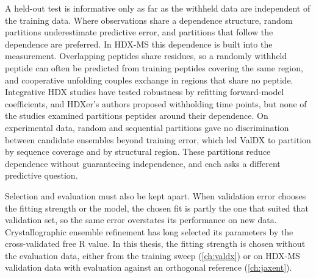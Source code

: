 A held-out test is informative only as far as the withheld data are independent of the training data. Where observations share a dependence structure, random partitions underestimate predictive error, and partitions that follow the dependence are preferred.\supercite{robertsCrossvalidationStrategiesData2017} In HDX-MS this dependence is built into the measurement. Overlapping peptides share residues, so a randomly withheld peptide can often be predicted from training peptides covering the same region, and cooperative unfolding couples exchange in regions that share no peptide.\supercite{englanderHydrogenExchangeModern1997,moulickPartiallyUnfoldedForms2015} Integrative HDX studies have tested robustness by refitting forward-model coefficients,\supercite{jiaIntegratingHydrogenDeuterium2023} and HDXer's authors proposed withholding time points,\supercite{bradshawInterpretationHDXData2020} but none of the studies examined partitions peptides around their dependence. On experimental data, random and sequential partitions gave no discrimination between candidate ensembles beyond training error, which led ValDX to partition by sequence coverage and by structural region.\supercite{siddiquiFrameworkTestingStructural2026} These partitions reduce dependence without guaranteeing independence, and each asks a different predictive question.

Selection and evaluation must also be kept apart. When validation error chooses the fitting strength or the model, the chosen fit is partly the one that suited that validation set, so the same error overstates its performance on new data.\supercite{cawleyOverfittingModelSelection2010} Crystallographic ensemble refinement has long selected its parameters by the cross-validated free R value.\supercite{burnleyModellingDynamicsProtein2012} In this thesis, the fitting strength is chosen without the evaluation data, either from the training sweep (\cref{ch:valdx}) or on HDX-MS validation data with evaluation against an orthogonal reference (\cref{ch:jaxent}).

